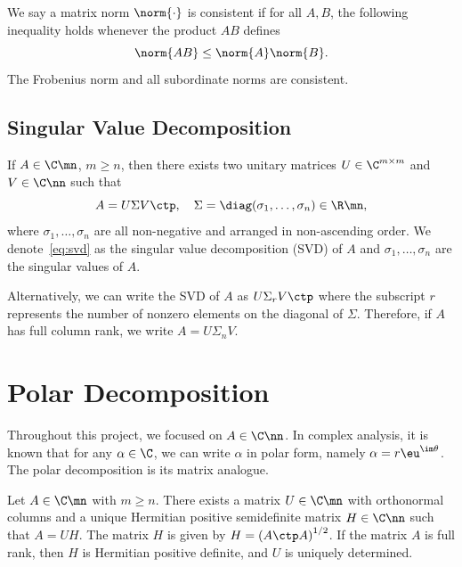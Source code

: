 \documentclass{article}
\numberwithin{equation}{section} %
\newcommand{\gnorm}[1]{\norm{#1}}
\begin{document}
    We say a matrix norm $\gnorm{\cdot}$ is consistent if for all $A,B$,
    the following inequality holds whenever the product $AB$ defines
    \begin{equation}
      \notag 
      \gnorm{AB} \leq \gnorm{A}\gnorm{B}.
    \end{equation}
    The Frobenius norm and all subordinate norms are consistent.

    \subsection{Singular Value Decomposition}\label{subsec:svd}
    \begin{theorem} 
    \label{thm:svd}
    If $A\in\C\mn$, $m\geq n$, then there exists two unitary matrices
    $U\in\C^{m\times m}$ and $V\in\C\nn$ such that
    \begin{equation}\label{eq:svd}
      A = U\Sigma V\ctp,\quad \Sigma = \diag(\sigma_1,\dots,\sigma_n)\in\R\mn,
    \end{equation}
    where $\sigma_1,\dots,\sigma_n$ are all non-negative and arranged in
    non-ascending order. We denote~\eqref{eq:svd} as the singular value
    decomposition (SVD) of $A$ and $\sigma_1,\dots,\sigma_n$ are the
    singular values of $A$.
    \end{theorem}

    Alternatively, we can write the SVD of $A$ as $U\Sigma_rV\ctp$ where
    the subscript $r$ represents the number of nonzero elements on the
    diagonal of $\Sigma$. Therefore, if $A$ has full column rank, we write
    $A = U\Sigma_n V$.




    \section{Polar Decomposition}\label{sec:polar-properties}

    Throughout this project, we focused on $A\in\C\nn$. In complex
    analysis, it is known that for any $\alpha\in\C$, we can write $\alpha$
    in polar form, namely $\alpha = r\eu^{\im \theta}$. The polar
    decomposition is its matrix analogue.

    \begin{theorem}  \label{def:pol-dec-definition} Let
    $A\in\C\mn$ with $m \geq n$. There exists a matrix $U\in\C\mn$ with
    orthonormal columns and a unique Hermitian positive semidefinite matrix
    $H\in\C\nn$ such that $A = UH$. The matrix $H$ is given by
    $H = \left(A\ctp A\right)^{1/2}$. If the matrix $A$ is full rank, then
    $H$ is Hermitian positive definite, and $U$ is uniquely determined.
    \end{theorem}
\end{document}
